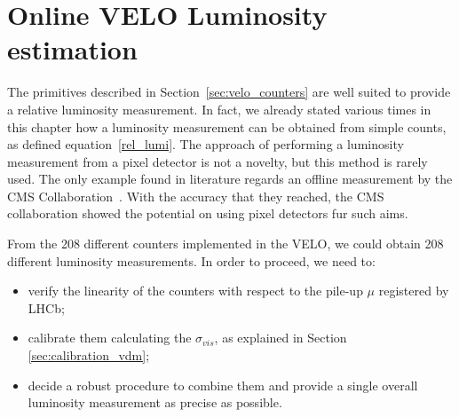\section{Online VELO Luminosity estimation}\label{lumi_measure}
The primitives described in Section~\ref{sec:velo_counters} are well suited to provide a relative luminosity measurement. In fact, we already stated various times in this chapter how a luminosity measurement can be obtained from simple counts, as defined equation~\eqref{rel_lumi}. The approach of performing a luminosity measurement from a pixel detector is not a novelty, but this method is rarely used. The only example found in literature regards an offline measurement by the CMS Collaboration~\cite{CMS-PAS-LUM-13-001}. With the accuracy that they reached, the CMS collaboration showed the potential on using pixel detectors fur such aims. 

From the 208 different counters implemented in the VELO, we could obtain 208 different luminosity measurements. 
In order to proceed, we need to:
\begin{itemize}
    \item verify the linearity of the counters with respect to the pile-up $\mu$ registered by LHCb;
    \item calibrate them calculating the $\sigma_{vis}$, as explained in Section \ref{sec:calibration_vdm};
    \item decide a robust procedure to combine them and provide a single overall luminosity measurement as precise as possible.
\end{itemize}

